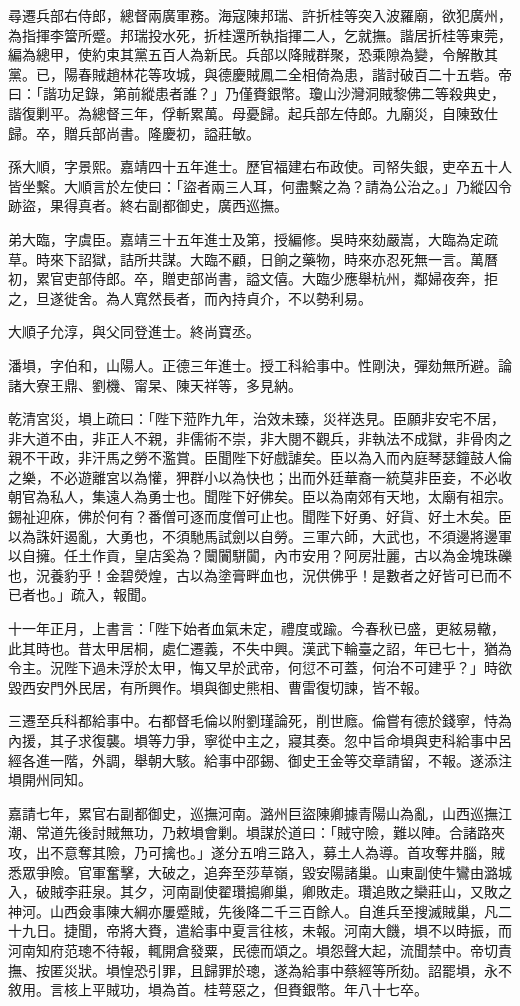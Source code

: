 \begin{pinyinscope}
尋遷兵部右侍郎，總督兩廣軍務。海寇陳邦瑞、許折桂等突入波羅廟，欲犯廣州，為指揮李簹所蹙。邦瑞投水死，折桂還所執指揮二人，乞就撫。諧居折桂等東莞，編為總甲，使約束其黨五百人為新民。兵部以降賊群聚，恐乘隙為變，令解散其黨。已，陽春賊趙林花等攻城，與德慶賊鳳二全相倚為患，諧討破百二十五砦。帝曰：「諧功足錄，第前縱患者誰？」乃僅賚銀幣。瓊山沙灣洞賊黎佛二等殺典史，諧復剿平。為總督三年，俘斬累萬。母憂歸。起兵部左侍郎。九廟災，自陳致仕歸。卒，贈兵部尚書。隆慶初，謚莊敏。

孫大順，字景熙。嘉靖四十五年進士。歷官福建右布政使。司帑失銀，吏卒五十人皆坐繫。大順言於左使曰：「盜者兩三人耳，何盡繫之為？請為公治之。」乃縱囚令跡盜，果得真者。終右副都御史，廣西巡撫。

弟大臨，字虞臣。嘉靖三十五年進士及第，授編修。吳時來劾嚴嵩，大臨為定疏草。時來下詔獄，詰所共謀。大臨不顧，日餉之藥物，時來亦忍死無一言。萬曆初，累官吏部侍郎。卒，贈吏部尚書，謚文僖。大臨少應舉杭州，鄰婦夜奔，拒之，旦遂徙舍。為人寬然長者，而內持貞介，不以勢利易。

大順子允淳，與父同登進士。終尚寶丞。

潘塤，字伯和，山陽人。正德三年進士。授工科給事中。性剛決，彈劾無所避。論諸大寮王鼎、劉機、甯杲、陳天祥等，多見納。

乾清宮災，塤上疏曰：「陛下蒞阼九年，治效未臻，災祥迭見。臣願非安宅不居，非大道不由，非正人不親，非儒術不崇，非大閱不觀兵，非執法不成獄，非骨肉之親不干政，非汗馬之勞不濫賞。臣聞陛下好戲謔矣。臣以為入而內庭琴瑟鐘鼓人倫之樂，不必遊離宮以為懽，狎群小以為快也；出而外廷華裔一統莫非臣妾，不必收朝官為私人，集遠人為勇士也。聞陛下好佛矣。臣以為南郊有天地，太廟有祖宗。錫祉迎庥，佛於何有？番僧可逐而度僧可止也。聞陛下好勇、好貨、好土木矣。臣以為誅奸遏亂，大勇也，不須馳馬試劍以自勞。三軍六師，大武也，不須邊將邊軍以自擁。任土作貢，皇店奚為？闤闠駢闐，內市安用？阿房壯麗，古以為金塊珠礫也，況養豹乎！金碧熒煌，古以為塗膏畔血也，況供佛乎！是數者之好皆可已而不已者也。」疏入，報聞。

十一年正月，上書言：「陛下始者血氣未定，禮度或踰。今春秋已盛，更絃易轍，此其時也。昔太甲居桐，處仁遷義，不失中興。漢武下輪臺之詔，年已七十，猶為令主。況陛下過未浮於太甲，悔又早於武帝，何愆不可蓋，何治不可建乎？」時欲毀西安門外民居，有所興作。塤與御史熊相、曹雷復切諫，皆不報。

三遷至兵科都給事中。右都督毛倫以附劉瑾論死，削世廕。倫嘗有德於錢寧，恃為內援，其子求復襲。塤等力爭，寧從中主之，寢其奏。忽中旨命塤與吏科給事中呂經各進一階，外調，舉朝大駭。給事中邵錫、御史王金等交章請留，不報。遂添注塤開州同知。

嘉請七年，累官右副都御史，巡撫河南。潞州巨盜陳卿據青陽山為亂，山西巡撫江潮、常道先後討賊無功，乃敕塤會剿。塤謀於道曰：「賊守險，難以陣。合諸路夾攻，出不意奪其險，乃可擒也。」遂分五哨三路入，募土人為導。首攻奪井腦，賊悉眾爭險。官軍奮擊，大破之，追奔至莎草嶺，毀安陽諸巢。山東副使牛鸞由潞城入，破賊李莊泉。其夕，河南副使翟瓚搗卿巢，卿敗走。瓚追敗之欒莊山，又敗之神河。山西僉事陳大綱亦屢蹙賊，先後降二千三百餘人。自進兵至搜滅賊巢，凡二十九日。捷聞，帝將大賚，遣給事中夏言往核，未報。河南大饑，塤不以時振，而河南知府范璁不待報，輒開倉發粟，民德而頌之。塤怨聲大起，流聞禁中。帝切責撫、按匿災狀。塤惶恐引罪，且歸罪於璁，遂為給事中蔡經等所劾。詔罷塤，永不敘用。言核上平賊功，塤為首。桂萼惡之，但賚銀幣。年八十七卒。


\end{pinyinscope}
